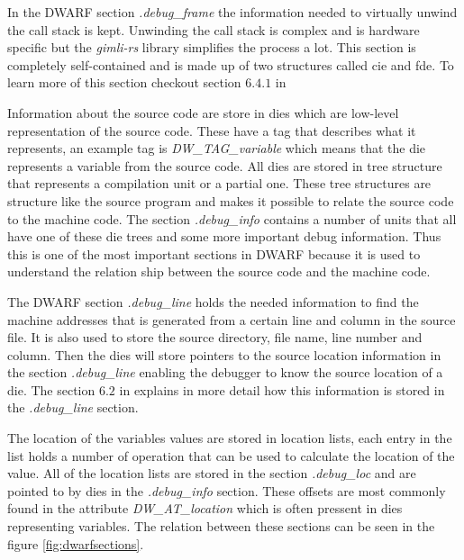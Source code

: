 In the \gls{DWARF} section \emph{.debug\_frame} the information needed to virtually unwind the call stack is kept.
Unwinding the call stack is complex and is hardware specific but the \emph{gimli-rs} library simplifies the process a lot.
This section is completely self-contained and is made up of two structures called \acrfull{cie} and \acrfull{fde}.
To learn more of this section checkout section $6.4.1$ in \cite{dwarf}


Information about the source code are store in \glspl{die} which are low-level representation of the source code.
These have a tag that describes what it represents, an example tag is \emph{DW\_TAG\_variable} which means that the \gls{die} represents a variable from the source code.
All \glspl{die} are stored in \gls{tree} structure that represents a compilation unit or a partial one.
These \gls{tree} structures are structure like the source program and makes it possible to relate the source code to the machine code.
The section \emph{.debug\_info} contains a number of units that all have one of these \gls{die} \glspl{tree} and some more important debug information.
Thus this is one of the most important sections in \gls{DWARF} because it is used to understand the relation ship between the source code and the machine code.


The \gls{DWARF} section \emph{.debug\_line} holds the needed information to find the machine addresses that is generated from a certain line and column in the source file.
It is also used to store the source directory, file name, line number and column.
Then the \glspl{die} will store pointers to the source location information in the section \emph{.debug\_line} enabling the debugger to know the source location of a \gls{die}.
The section $6.2$ in \cite{dwarf} explains in more detail how this information is stored in the \emph{.debug\_line} section.


The location of the variables values are stored in location lists, each entry in the list holds a number of operation that can be used to calculate the location of the value.
All of the location lists are stored in the section \emph{.debug\_loc} and are pointed to by \glspl{die} in the \emph{.debug\_info} section.
These offsets are most commonly found in the attribute \emph{DW\_AT\_location} which is often pressent in \glspl{die} representing variables.
The relation between these sections can be seen in the figure \ref{fig:dwarfsections}.


